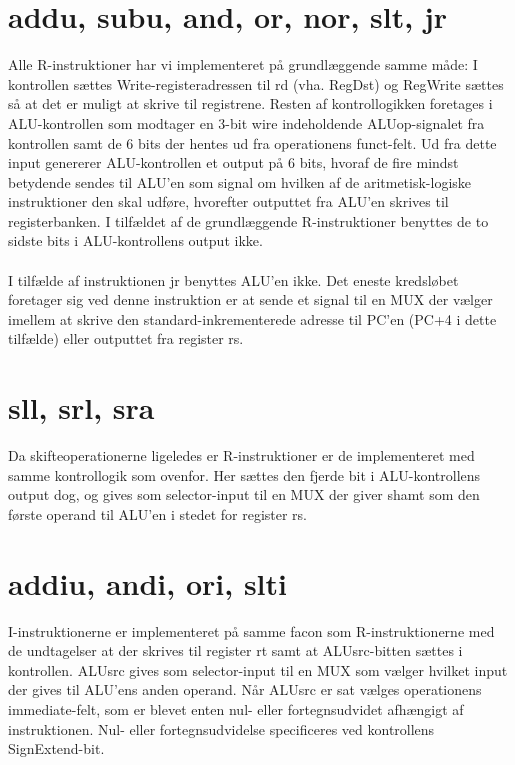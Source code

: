 \documentclass[10pt,a4paper,danish]{article}
\begin{document}
\section{addu, subu, and, or, nor, slt, jr}
Alle R-instruktioner har vi implementeret på grundlæggende samme måde: I
kontrollen sættes Write-registeradressen til rd (vha. RegDst) og RegWrite sættes
så at det er muligt at skrive til registrene. Resten af kontrollogikken
foretages i ALU-kontrollen som modtager en 3-bit wire indeholdende
ALUop-signalet fra kontrollen samt de 6 bits der hentes ud fra operationens
funct-felt. Ud fra dette input genererer ALU-kontrollen et output på 6 bits,
hvoraf de fire mindst betydende sendes til ALU'en som signal om hvilken af de
aritmetisk-logiske instruktioner den skal udføre, hvorefter outputtet fra ALU'en
skrives til registerbanken. I tilfældet af de grundlæggende R-instruktioner
benyttes de to sidste bits i ALU-kontrollens output ikke.

\paragraph{}
I tilfælde af instruktionen jr benyttes ALU'en ikke. Det eneste kredsløbet
foretager sig ved denne instruktion er at sende et signal til en MUX der vælger
imellem at skrive den standard-inkrementerede adresse til PC'en (PC+4 i dette
tilfælde) eller outputtet fra register rs. 

\section{sll, srl, sra}
Da skifteoperationerne ligeledes er R-instruktioner er de implementeret med
samme kontrollogik som ovenfor. Her sættes den fjerde bit i ALU-kontrollens
output dog, og gives som selector-input til en MUX der giver shamt som den
første operand til ALU'en i stedet for register rs. 

\section{addiu, andi, ori, slti} 
I-instruktionerne er implementeret på samme facon som R-instruktionerne med de
undtagelser at der skrives til register rt samt at ALUsrc-bitten sættes i
kontrollen. ALUsrc gives som selector-input til en MUX som vælger hvilket input
der gives til ALU'ens anden operand. Når ALUsrc er sat vælges operationens
immediate-felt, som er blevet enten nul- eller fortegnsudvidet afhængigt af
instruktionen. Nul- eller fortegnsudvidelse specificeres ved kontrollens
SignExtend-bit. 
\end{document}
